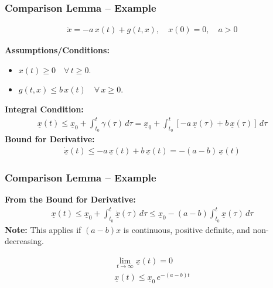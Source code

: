 \documentclass[student, noshadow, lsr, english, aspectratio=169, t]{ITR_LSR_slides}
\begin{document}
\begin{frame}
    \frametitle{Comparison Lemma – Example}

	\vspace{-0.5cm}
	\begin{tcolorbox}[title=Problem: Analyze stability of a scalar perturbed system]
		\vspace{-0.4cm}
		\begin{align*}
			\dot{x} = -a\,x(t) + g(t, x), \quad x(0) = 0, \quad a > 0
		\end{align*}
	\end{tcolorbox}

    \textbf{Assumptions/Conditions:}
    \begin{itemize}
        \item $x(t) \geq 0 \quad \forall\, t \geq 0$.
        \item $g(t, x) \leq b\,x(t) \quad \forall\, x \geq 0$.
    \end{itemize}
	\vspace{0.3cm}
	\textbf{Integral Condition:}
	\begin{align*}
	\underline{x}(t) \leq \underline{x}_0 + \int_{t_0}^{t} \gamma(\tau)\, d\tau
	= \underline{x}_0 + \int_{t_0}^{t} [-a\,\underline{x}(\tau) + b\,\underline{x}(\tau)]\, d\tau
	\end{align*}
	\vspace{0.3cm}
	\textbf{Bound for Derivative:}
	\begin{align*}
	\dot{\underline{x}}(t) \leq -a\,\underline{x}(t) + b\,\underline{x}(t) = -(a - b)\,\underline{x}(t)
	\end{align*}
	\end{frame}
	
\begin{frame}
	\frametitle{Comparison Lemma – Example}
	\textbf{From the Bound for Derivative:}
	\begin{align*}
		\underline{x}(t) \leq \underline{x}_0 + \int_{t_0}^{t} \dot{\underline{x}}(\tau)\, d\tau
		\leq \underline{x}_0 - (a - b) \int_{t_0}^{t} \underline{x}(\tau)\, d\tau
	\end{align*}
	\vspace{0.3cm}
	\textbf{Note:} This applies if $(a-b)x$ is continuous, positive definite, and non-decreasing.
	\vspace{-0.3cm}
	\begin{tcolorbox}[title=Conclusion: Exponential Stability of the Perturbed System]
		\vspace{-0.4cm}
		\begin{align*}
			\lim_{t \to \infty} \underline{x}(t) = 0 \\[0.3cm]
			\underline{x}(t) \leq \underline{x}_0\, e^{-(a - b)t}
		\end{align*}
	\end{tcolorbox}
\end{frame}
\end{document}
